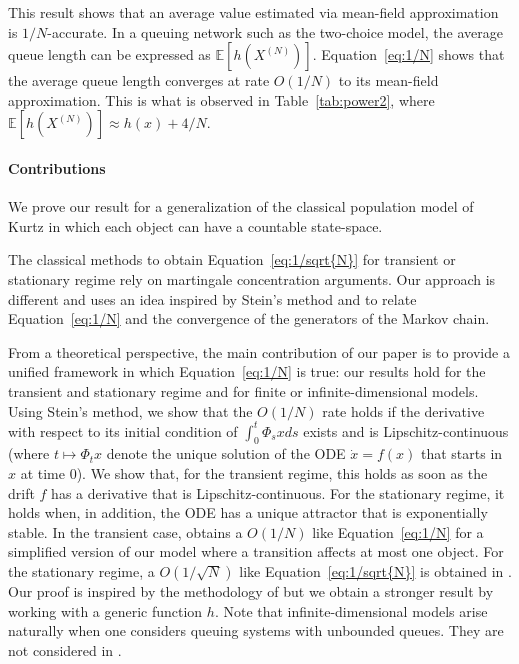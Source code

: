 \documentclass[acmlarge]{acmart}
\newcommand\XN{X^{(N)}}
\newcommand\sesp[1]{\mathbb{E}[#1]}
\begin{document}
This result shows that an average value estimated via mean-field
approximation is $1/N$-accurate.  In a queuing network such as the
two-choice model, the average queue length can be expressed as
$\sesp{h(\XN)}$.  Equation~\eqref{eq:1/N} shows that the average queue
length converges at rate $O(1/N)$ to its mean-field approximation.
This is what is observed in Table~\ref{tab:power2}, where 
$\sesp{h(\XN)}\approx h(x)+4/N$.

\paragraph*{Contributions}
We prove our result for a generalization of the classical population
model of Kurtz in which each object can have a countable
state-space.

The classical methods to obtain Equation~\eqref{eq:1/sqrt{N}} for
transient \cite{benaim2008class,kurtz70} or stationary regime
\cite{bortolussi2013bounds} rely on martingale concentration
arguments.  Our approach is different and uses an idea inspired by
Stein's method and
\cite{kolokoltsov2011mean,stein1986approximate,ying2016rate} to relate
Equation~\eqref{eq:1/N} and the convergence of the generators of the
Markov chain.  

From a theoretical perspective, the main contribution of our paper is
to provide a unified framework in which Equation~\eqref{eq:1/N} is
true: our results hold for the transient and stationary regime and for
finite or infinite-dimensional models.  Using Stein's method, we show
that the $O(1/N)$ rate holds if the derivative with respect to its
initial condition of $\int_0^t\Phi_sxds$ exists and is
Lipschitz-continuous (where $t\mapsto\Phi_tx$ denote the unique
solution of the ODE $\dot{x}=f(x)$ that starts in $x$ at time $0$).
We show that, for the transient regime, this holds as soon as the
drift $f$ has a derivative that is Lipschitz-continuous. For the
stationary regime, it holds when, in addition, the ODE has a unique
attractor that is exponentially stable.  In the transient case,
\cite{kolokoltsov2011mean} obtains a $O(1/N)$ like
Equation~\eqref{eq:1/N} for a simplified version of our model where a
transition affects at most one object.  For the stationary regime, a
$O(1/\sqrt{N})$ like Equation~\eqref{eq:1/sqrt{N}} is obtained in
\cite{ying2016rate}. Our proof is inspired by the methodology of
\cite{ying2016rate} but we obtain a stronger result by working with a
generic function $h$.  Note that infinite-dimensional models arise
naturally when one considers queuing systems with unbounded
queues. They are not considered in
\cite{kolokoltsov2011mean,ying2016rate}.
\end{document}
